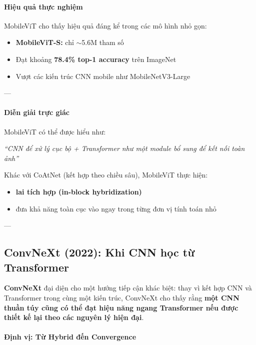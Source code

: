 \paragraph{Hiệu quả thực nghiệm}

MobileViT cho thấy hiệu quả đáng kể trong các mô hình nhỏ gọn:
\begin{itemize}
	\item \textbf{MobileViT-S:} chỉ $\sim$5.6M tham số
	\item Đạt khoảng \textbf{78.4\% top-1 accuracy} trên ImageNet
	\item Vượt các kiến trúc CNN mobile như MobileNetV3-Large
\end{itemize}

---

\paragraph{Diễn giải trực giác}

MobileViT có thể được hiểu như:

\begin{center}
	\textit{“CNN để xử lý cục bộ + Transformer như một module bổ sung để kết nối toàn ảnh”}
\end{center}

Khác với CoAtNet (kết hợp theo chiều sâu), MobileViT thực hiện:
\begin{itemize}
	\item \textbf{lai tích hợp (in-block hybridization)}
	\item đưa khả năng toàn cục vào ngay trong từng đơn vị tính toán nhỏ
\end{itemize}

---

\subsection{ConvNeXt (2022): Khi CNN học từ Transformer}
\label{subsec:convnext_as_hybrid}

\textbf{ConvNeXt} \cite{Liu2022} đại diện cho một hướng tiếp cận khác biệt:  
thay vì kết hợp CNN và Transformer trong cùng một kiến trúc, ConvNeXt cho thấy rằng \textbf{một CNN thuần túy cũng có thể đạt hiệu năng ngang Transformer nếu được thiết kế lại theo các nguyên lý hiện đại}.

\paragraph{Định vị: Từ Hybrid đến Convergence}


